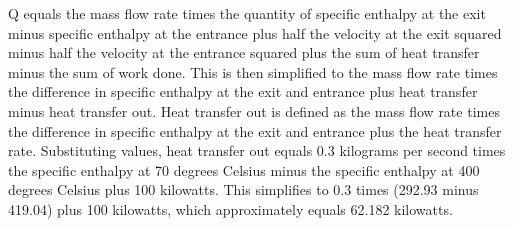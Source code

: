 Q equals the mass flow rate times the quantity of specific enthalpy at the exit minus specific enthalpy at the entrance plus half the velocity at the exit squared minus half the velocity at the entrance squared plus the sum of heat transfer minus the sum of work done. This is then simplified to the mass flow rate times the difference in specific enthalpy at the exit and entrance plus heat transfer minus heat transfer out. Heat transfer out is defined as the mass flow rate times the difference in specific enthalpy at the exit and entrance plus the heat transfer rate. Substituting values, heat transfer out equals 0.3 kilograms per second times the specific enthalpy at 70 degrees Celsius minus the specific enthalpy at 400 degrees Celsius plus 100 kilowatts. This simplifies to 0.3 times (292.93 minus 419.04) plus 100 kilowatts, which approximately equals 62.182 kilowatts.